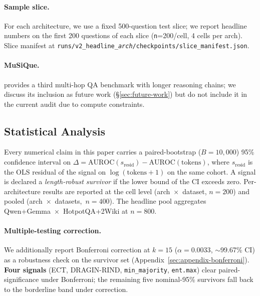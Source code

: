 \documentclass[11pt]{article}
\begin{document}
\paragraph{Sample slice.} For each architecture, we use a fixed 500-question
test slice; we report headline numbers on the first 200 questions of each
slice (\texttt{n}=200/cell, 4 cells per arch). Slice manifest at
\texttt{runs/v2\_headline\_\textit{arch}/checkpoints/slice\_manifest.json}.

\paragraph{MuSiQue.} \cite{Trivedi_MuSiQue} provides a third multi-hop QA
benchmark with longer reasoning chains; we discuss its inclusion as future
work (\S\ref{sec:future-work}) but do not include it in the current audit due
to compute constraints.

\subsection{Statistical Analysis}
\label{sec:methods-stats}

Every numerical claim in this paper carries a paired-bootstrap
($B{=}10{,}000$) 95\% confidence interval on
$\Delta = \text{AUROC}(s_{\text{resid}}) - \text{AUROC}(\text{tokens})$,
where $s_{\text{resid}}$ is the OLS residual of the signal on
$\log(\text{tokens}+1)$ on the same cohort.  A
signal is declared a \emph{length-robust survivor} if the lower bound of the
CI exceeds zero. Per-architecture results are reported at the cell level
(arch~$\times$~dataset, $n{=}200$) and pooled
(arch~$\times$~datasets,~$n{=}400$). The headline pool aggregates
Qwen+Gemma~$\times$~HotpotQA+2Wiki at $n{=}800$.

\paragraph{Multiple-testing correction.} We additionally report Bonferroni
correction at $k{=}15$ ($\alpha = 0.0033$, $\sim$99.67\% CI) as a
robustness check on the survivor set (Appendix~\ref{sec:appendix-bonferroni}).
\textbf{Four signals} (ECT, DRAGIN-RIND, \texttt{min\_majority},
\texttt{ent.max}) clear paired-significance under Bonferroni; the remaining
five nominal-95\% survivors fall back to the borderline band under
correction.
\end{document}
